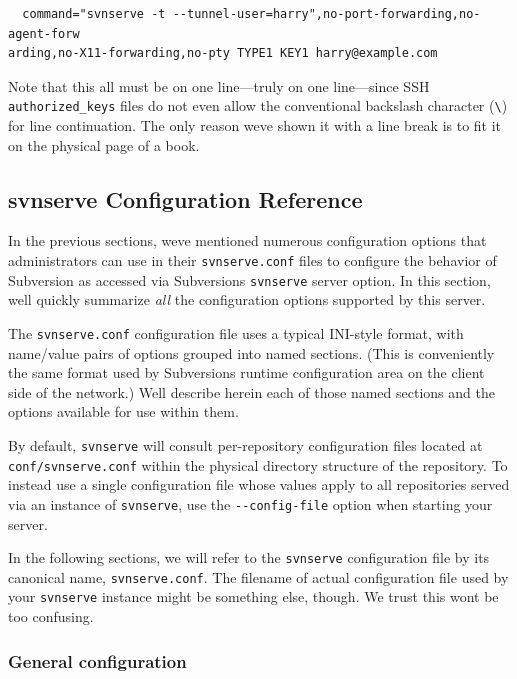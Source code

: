 \begin{verbatim}
  command="svnserve -t --tunnel-user=harry",no-port-forwarding,no-agent-forw
arding,no-X11-forwarding,no-pty TYPE1 KEY1 harry@example.com
\end{verbatim}

Note that this all must be on one line---truly on one line---since SSH
\texttt{authorized\_keys} files do not even allow the conventional
backslash character (\texttt{\textbackslash{}}) for line continuation.
The only reason we\textquotesingle ve shown it with a line break is to
fit it on the physical page of a book.

\subsection{svnserve Configuration
Reference}\label{svn.serverconfig.svnserve.ref}

In the previous sections, we\textquotesingle ve mentioned numerous
configuration options that administrators can use in their
\texttt{svnserve.conf} files to configure the behavior of Subversion as
accessed via Subversion\textquotesingle s \texttt{svnserve} server
option. In this section, we\textquotesingle ll quickly summarize
\emph{all} the configuration options supported by this server.

The \texttt{svnserve.conf} configuration file uses a typical INI-style
format, with name/value pairs of options grouped into named sections.
(This is conveniently the same format used by
Subversion\textquotesingle s runtime configuration area on the client
side of the network.) We\textquotesingle ll describe herein each of
those named sections and the options available for use within them.

By default, \texttt{svnserve} will consult per-repository configuration
files located at \texttt{conf/svnserve.conf} within the physical
directory structure of the repository. To instead use a single
configuration file whose values apply to all repositories served via an
instance of \texttt{svnserve}, use the \texttt{-\/-config-file} option
when starting your server.

In the following sections, we will refer to the \texttt{svnserve}
configuration file by its canonical name, \texttt{svnserve.conf}. The
filename of actual configuration file used by your \texttt{svnserve}
instance might be something else, though. We trust this
won\textquotesingle t be too confusing.

\subsubsection{General
configuration}\label{svn.serverconfig.svnserve.ref.general}

